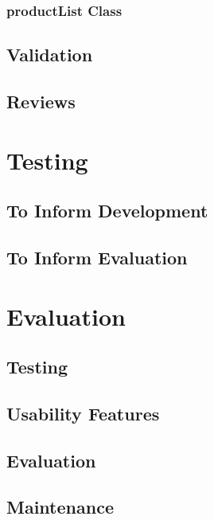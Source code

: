 ﻿\documentclass{article}
\begin{document}
    \subsubsection{productList Class}
    \subsection{Validation}
    \subsection{Reviews}
    
    
    \section{Testing}
    \subsection{To Inform Development}
    \subsection{To Inform Evaluation}
    
    
    \section{Evaluation}
    \subsection{Testing}
    \subsection{Usability Features}
    \subsection{Evaluation}
    \subsection{Maintenance}
\end{document}
